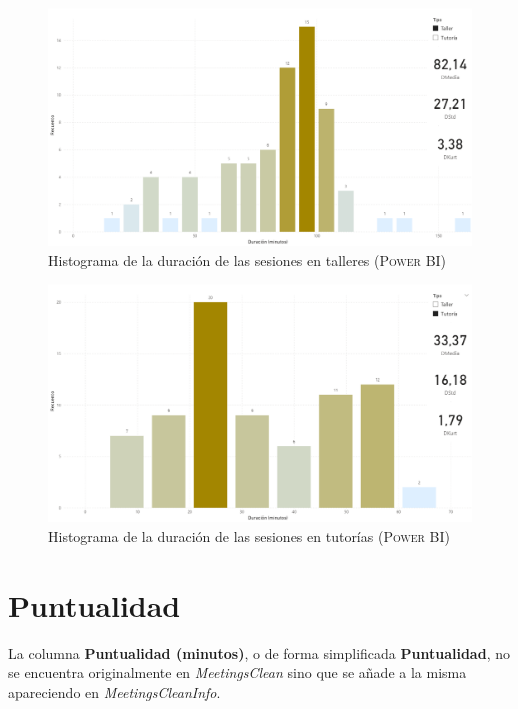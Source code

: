 \documentclass[11pt,a4paper]{book}
\theoremstyle{definition}%
\begin{document}
                \begin{figure}[H]
                    \centering
                    \includegraphics[width=1\textwidth]{Sources/histograma_DuracionTaller.png}
                    \caption{Histograma de la duración de las sesiones en talleres (\textsc{Power BI})}
                    \label{fig:histograma_DuracionTaller}
                \end{figure}
                \begin{figure}[H]
                    \centering
                    \includegraphics[width=1\textwidth]{Sources/histograma_DuracionTutoria.png}
                    \caption{Histograma de la duración de las sesiones en tutorías (\textsc{Power BI})}
                    \label{fig:histograma_DuracionTutoria}
                \end{figure}
            \section{Puntualidad}
                La columna \textbf{Puntualidad (minutos)}, o de forma simplificada \textbf{Puntualidad}, no se encuentra originalmente en \textit{MeetingsClean} sino que se añade a la misma apareciendo en \textit{MeetingsCleanInfo}.
                
\end{document}

